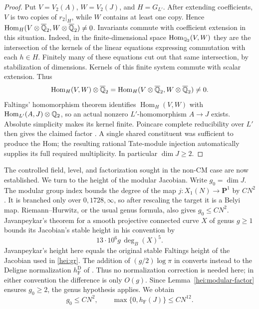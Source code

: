 \begin{proof}
Put $V=V_2(A)$, $W=V_2(J)$, and $H=G_{L'}$.  After extending
coefficients, $V$ is two copies of $r_2|_H$, while $W$ contains at
least one copy.  Hence
$\operatorname{Hom}_H(V\otimes\overline{\mathbb Q}_2,
W\otimes\overline{\mathbb Q}_2)\ne0$.  Invariants commute with coefficient
extension in this situation.  Indeed, in the finite-dimensional
space $\operatorname{Hom}_{\mathbb Q_2}(V,W)$ they are the intersection of
the kernels of the linear equations expressing commutation with
each $h\in H$.  Finitely many of these equations cut out that same
intersection, by stabilization of dimensions.  Kernels of this
finite system commute with scalar extension.  Thus
\[
 \operatorname{Hom}_H(V,W)\otimes\overline{\mathbb Q}_2
 =\operatorname{Hom}_H(V\otimes\overline{\mathbb Q}_2,
                     W\otimes\overline{\mathbb Q}_2)\ne0.
\]
Faltings' homomorphism theorem identifies
$\operatorname{Hom}_H(V,W)$ with
$\operatorname{Hom}_{L'}(A,J)\otimes\mathbb Q_2$, so an actual nonzero
$L'$-homomorphism $A\to J$ exists.  Absolute simplicity makes its
kernel finite.  Poincare complete reducibility over $L'$ then gives
the claimed factor \cite{Faltings1983,Mumford1970}.  A single shared
constituent was sufficient to produce the Hom; the resulting rational
Tate-module injection automatically supplies its full required
multiplicity.  In particular $\dim J\ge2$.
\end{proof}

The controlled field, level, and factorization sought in the non-CM
case are now established.  We turn to the height of the modular
Jacobian.  Write $g_0=\dim J$.  The modular group index bounds the
degree of the map $j:X_1(N)\to\mathbf P^1$ by $C N^2$.  It is
branched only over $0,1728,\infty$, so after rescaling the target it
is a Belyi map.  Riemann--Hurwitz, or the usual genus formula, also
gives $g_0\le C N^2$.  Javanpeykar's theorem
\cite[Theorem 1.1.1 and Section 2.3]{Javanpeykar2014} for a smooth
projective connected curve $X$ of genus $g\ge1$ bounds its Jacobian's
stable height in his convention by
\[
                 13\cdot10^6 g\,\deg_B(X)^5.
\]
Javanpeykar's height here equals the original stable Faltings
height of the Jacobian used in \eqref{hei:gr}.  The addition of
$(g/2)\log\pi$ in \cite[Lemma 2.4.4]{Javanpeykar2014} converts
instead to the Deligne normalization $h_{\mathrm F}^{\mathrm D}$
of \cite[Section 2.3]{GaudronRemondPeriods2014}.
Thus no normalization correction is needed here; in either
convention the difference is only $O(g)$.
Since Lemma~\ref{hei:modular-factor} ensures $g_0\ge2$,
the genus hypothesis applies.  We obtain
\begin{equation}\label{hei:jacobian-height}
         g_0\le C N^2,
         \qquad \max\{0,h_{\mathrm F}(J)\}\le C N^{12}.
\end{equation}


